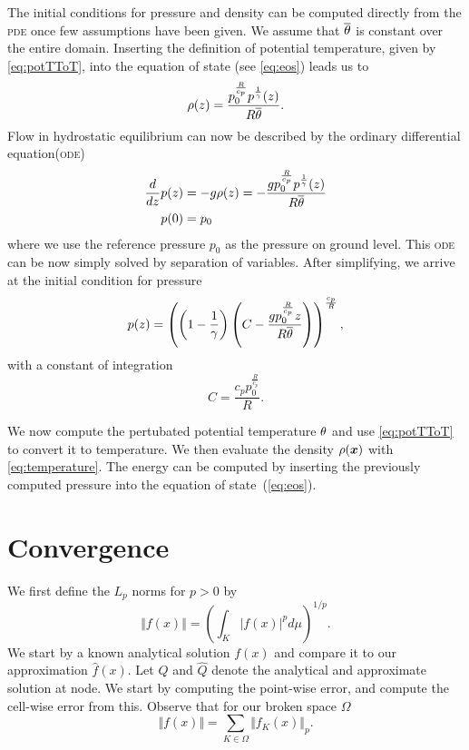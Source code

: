 The initial conditions for pressure and density can be computed directly from the \textsc{pde} once few assumptions have been given.
We assume that $\overline{\theta}$ is constant over the entire domain.
Inserting the definition of potential temperature, given by \cref{eq:potTToT}, into the equation of state (see \cref{eq:eos}) leads us to
\begin{equation}
  \label{eq:eos-potT}
\rho(z) = \frac{p_{0}^{\frac{R}{c_{p}}} p^{\frac{1}{\gamma}}{\left (z \right )}}{R \overline{\theta}}.
\end{equation}
Flow in hydrostatic equilibrium can now be described by the ordinary differential equation(\textsc{ode})
\begin{align}
  \label{eq:hydrostatic-balance-potT}
  \frac{d}{d z} p{\left (z \right )} &= -g \rho(z)
                                     = 
        - \frac{g p_{0}^{\frac{R}{c_{p}}} p^{\frac{1}{\gamma}}{\left (z \right )}}{R \overline{\theta}}\\
  p{\left (0 \right )} &= p_0
\end{align}
where we use the reference pressure $p_0$ as the pressure on ground level.
This \textsc{ode} can be now simply solved by separation of variables.
After simplifying, we arrive at the initial condition for pressure
\begin{equation}
p(z) = \left(\left(1 - \frac{1}{\gamma}\right) \left(C - \frac{g p_{0}^{\frac{R}{c_{p}}} z}{R \overline{\theta}}\right)\right)^{\frac{c_{p}}{R}},
\end{equation}
with a constant of integration
\begin{equation}
  \label{eq:hydrostatic-balance-constant}
 C = \frac{c_{p} p_{0}^{\frac{R}{c_{p}}}}{R}.
\end{equation}

We now compute the pertubated potential temperature $\theta$ and use \cref{eq:potTToT} to convert it to temperature.
We then evaluate the density $\rho(\bm{x})$ with \cref{eq:temperature}.
The energy can be computed by inserting the previously computed pressure into the equation of state~(\ref{eq:eos}).

\section{Convergence}
We first define the $L_p$ norms for $p > 0$ by
\begin{equation}
  \label{eq:Lp-nrom}
  \Vert f(x) \Vert = \left( \int_K \vert f(x) \vert^p d\mu  \right)^{1/p}.
\end{equation}
We start by a known analytical solution $f(x)$ and compare it to our approximation $\hat{f}(x)$.
Let $Q$ and $\hat{Q}$ denote the analytical and approximate solution at node.
We start by computing the point-wise error, and compute the cell-wise error from this.
Observe that for our broken space $\Omega$
\begin{equation}
  \label{eq:lp-norm-broken}
 \Vert f(x) \Vert = \sum_{K \in \Omega} \Vert f_K(x) \Vert_p.
\end{equation}

